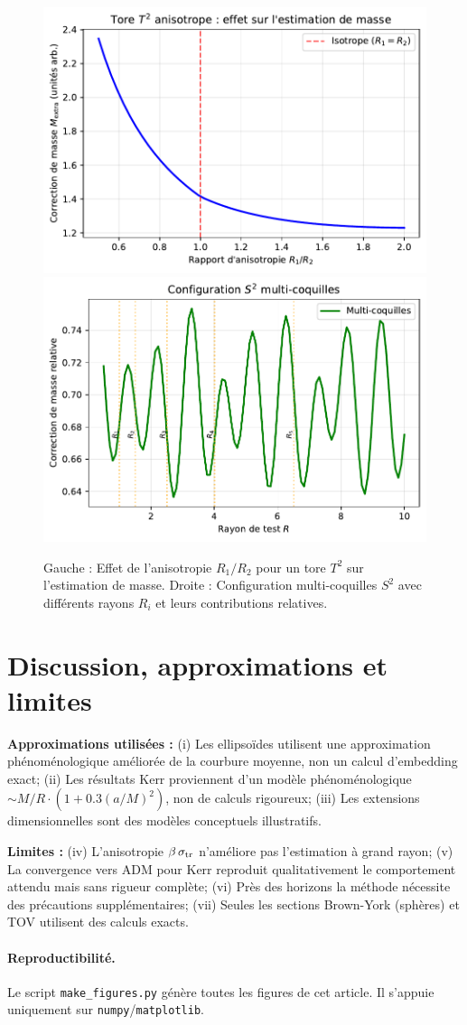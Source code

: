 \documentclass[11pt]{article}
\begin{document}
\begin{figure}[!htb]
\centering
\includegraphics[width=.48\linewidth]{fig_torus_anisotropic.pdf}
\includegraphics[width=.48\linewidth]{fig_sphere_multishell.pdf}
\caption{Gauche : Effet de l'anisotropie $R_1/R_2$ pour un tore $T^2$ sur l'estimation de masse. Droite : Configuration multi-coquilles $S^2$ avec diff\'erents rayons $R_i$ et leurs contributions relatives.}
\end{figure}
\clearpage

\section{Discussion, approximations et limites}
\textbf{Approximations utilis\'ees :} 
(i) Les ellipso\"ides utilisent une approximation ph\'enom\'enologique am\'elior\'ee de la courbure moyenne, non un calcul d'embedding exact; 
(ii) Les r\'esultats Kerr proviennent d'un mod\`ele ph\'enom\'enologique $\sim M/R \cdot (1 + 0.3(a/M)^2)$, non de calculs rigoureux; 
(iii) Les extensions dimensionnelles sont des mod\`eles conceptuels illustratifs.

\textbf{Limites :} 
(iv) L'anisotropie $\beta\,\sigma_{\rm tr}$ n'am\'eliore pas l'estimation \`a grand rayon; 
(v) La convergence vers ADM pour Kerr reproduit qualitativement le comportement attendu mais sans rigueur compl\`ete; 
(vi) Pr\`es des horizons la m\'ethode n\'ecessite des pr\'ecautions suppl\'ementaires;
(vii) Seules les sections Brown-York (sph\`eres) et TOV utilisent des calculs exacts.

\paragraph{Reproductibilit\'e.}
Le script \texttt{make\_figures.py} g\'en\`ere toutes les figures de cet article. Il s'appuie uniquement sur \texttt{numpy}/\texttt{matplotlib}.
\end{document}
